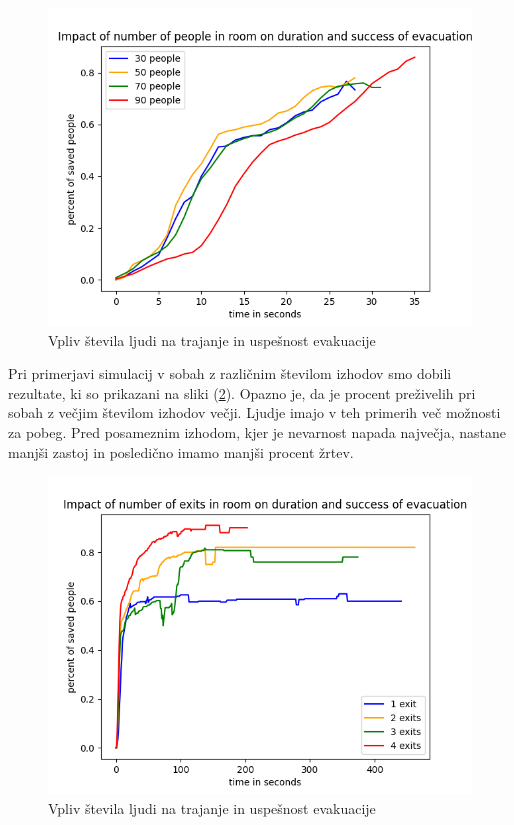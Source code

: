 \documentclass[9pt]{pnas-new}
\begin{document}
\begin{figure}
	\centering
	\includegraphics[scale=0.5]{fig/hallway_evacuation_procent.png}
	\caption{Vpliv števila ljudi na trajanje in uspešnost evakuacije}
	\label{hodnik_fig}
\end{figure}

Pri primerjavi simulacij v sobah z različnim številom izhodov smo dobili rezultate, ki so prikazani na sliki (\ref{soba_fig}). Opazno je, da je procent preživelih pri sobah z večjim številom izhodov večji. Ljudje imajo v teh primerih več možnosti za pobeg. Pred posameznim izhodom, kjer je nevarnost napada največja, nastane manjši zastoj in posledično imamo manjši procent žrtev.

\begin{figure}
	\centering
	\includegraphics[scale=0.5]{fig/room_evacuation_procent.png}
	\caption{Vpliv števila ljudi na trajanje in uspešnost evakuacije}
	\label{soba_fig}
\end{figure}
\end{document}
